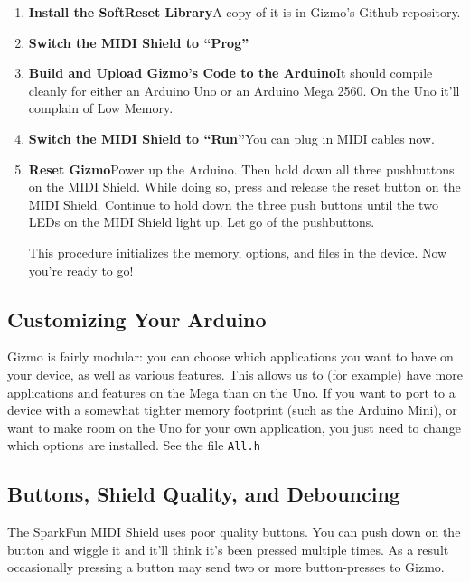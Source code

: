 \documentclass{article}
\begin{document}
\begin{enumerate}
\item {\bf Install the SoftReset Library}\quad A copy of it is in Gizmo's Github repository.

\item {\bf Switch the MIDI Shield to ``Prog''}

\item {\bf Build and Upload Gizmo's Code to the Arduino}\quad  It should compile cleanly for either an Arduino Uno or an Arduino Mega 2560.  On the Uno it'll complain of Low Memory.

\item {\bf Switch the MIDI Shield to ``Run''}\quad  You can plug in MIDI cables now.

\item {\bf Reset Gizmo}\quad Power up the Arduino.  Then hold down all three pushbuttons on the MIDI Shield.  While doing so, press and release the reset button on the MIDI Shield.  Continue to hold down the three push buttons until the two LEDs on the MIDI Shield light up.  Let go of the pushbuttons.  

This procedure initializes the memory, options, and files in the device.  Now you're ready to go!

\end{enumerate}

\subsection{Customizing Your Arduino}

Gizmo is fairly modular: you can choose which applications you want to have on your device, as well as various features.  This allows us to (for example) have more applications and features on the Mega than on the Uno.  If you want to port to a device with a somewhat tighter memory footprint (such as the Arduino Mini), or want to make room on the Uno for your own application, you just need to change which options are installed.  See the file \texttt{All.h}

\subsection{Buttons, Shield Quality, and Debouncing}
\label{debouncing}

The SparkFun MIDI Shield uses poor quality buttons.  You can push down on the button and wiggle it and it'll think it's been pressed multiple times.  As a result occasionally pressing a button may send two or more button-presses to Gizmo.
\end{document}
